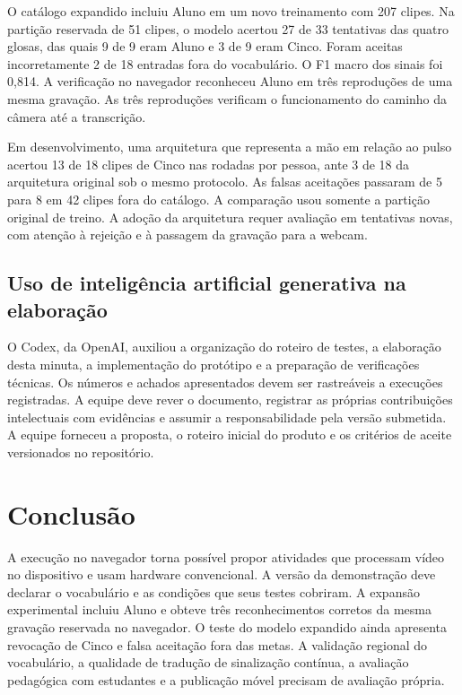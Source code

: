 \documentclass[12pt,a4paper]{article}
\begin{document}
O catálogo expandido incluiu Aluno em um novo treinamento com 207 clipes. Na partição reservada de 51 clipes, o modelo acertou 27 de 33 tentativas das quatro glosas, das quais 9 de 9 eram Aluno e 3 de 9 eram Cinco. Foram aceitas incorretamente 2 de 18 entradas fora do vocabulário. O F1 macro dos sinais foi 0,814. A verificação no navegador reconheceu Aluno em três reproduções de uma mesma gravação. As três reproduções verificam o funcionamento do caminho da câmera até a transcrição.

Em desenvolvimento, uma arquitetura que representa a mão em relação ao pulso acertou 13 de 18 clipes de Cinco nas rodadas por pessoa, ante 3 de 18 da arquitetura original sob o mesmo protocolo. As falsas aceitações passaram de 5 para 8 em 42 clipes fora do catálogo. A comparação usou somente a partição original de treino. A adoção da arquitetura requer avaliação em tentativas novas, com atenção à rejeição e à passagem da gravação para a webcam.

\subsection{Uso de inteligência artificial generativa na elaboração}

O Codex, da OpenAI, auxiliou a organização do roteiro de testes, a elaboração desta minuta, a implementação do protótipo e a preparação de verificações técnicas. Os números e achados apresentados devem ser rastreáveis a execuções registradas. A equipe deve rever o documento, registrar as próprias contribuições intelectuais com evidências e assumir a responsabilidade pela versão submetida. A equipe forneceu a proposta, o roteiro inicial do produto e os critérios de aceite versionados no repositório.

\section{Conclusão}

A execução no navegador torna possível propor atividades que processam vídeo no dispositivo e usam hardware convencional. A versão da demonstração deve declarar o vocabulário e as condições que seus testes cobriram. A expansão experimental incluiu Aluno e obteve três reconhecimentos corretos da mesma gravação reservada no navegador. O teste do modelo expandido ainda apresenta revocação de Cinco e falsa aceitação fora das metas. A validação regional do vocabulário, a qualidade de tradução de sinalização contínua, a avaliação pedagógica com estudantes e a publicação móvel precisam de avaliação própria.
\end{document}
